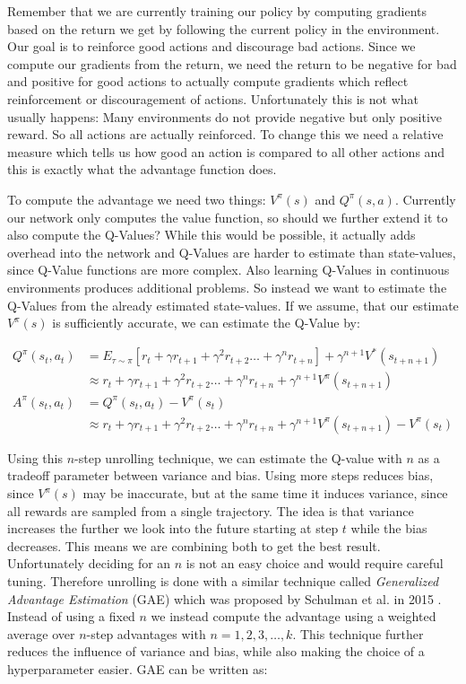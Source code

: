 Remember that we are currently training our policy by computing gradients based on the return we get by following the current policy in the environment. Our goal is to reinforce good actions and discourage bad actions. Since we compute our gradients from the return, we need the return to be negative for bad and positive for good actions to actually compute gradients which reflect reinforcement or discouragement of actions. Unfortunately this is not what usually happens: Many environments do not provide negative but only positive reward. So all actions are actually reinforced. To change this we need a relative measure which tells us how good an action is compared to all other actions and this is exactly what the advantage function does. 

To compute the advantage we need two things: $V^\pi(s)$ and $Q^\pi(s, a)$. Currently our network only computes the value function, so should we further extend it to also compute the Q-Values? While this would be possible, it actually adds overhead into the network and Q-Values are harder to estimate than state-values, since Q-Value functions are more complex. Also learning Q-Values in continuous environments produces additional problems. So instead we want to estimate the Q-Values from the already estimated state-values. If we assume, that our estimate $V^\pi(s)$ is sufficiently accurate, we can estimate the Q-Value by:

\begin{align*}
Q^\pi(s_t, a_t) &= E_{\tau\sim\pi}\left[r_t + \gamma r_{t+1} + \gamma^2 r_{t+2} \dots + \gamma^n r_{t+n}\right] + \gamma^{n+1}V^*(s_{t+n+1}) \\
&\approx r_t + \gamma r_{t+1} + \gamma^2 r_{t+2} \dots + \gamma^n r_{t+n} + \gamma^{n+1}V^\pi(s_{t+n+1}) \\[15pt]
A^\pi(s_t, a_t) &= Q^\pi(s_t, a_t) - V^\pi(s_t) \\
&\approx r_t + \gamma r_{t+1} + \gamma^2 r_{t+2} \dots + \gamma^n r_{t+n} + \gamma^{n+1}V^\pi(s_{t+n+1}) - V^\pi(s_t)
\end{align*}

Using this $n$-step unrolling technique, we can estimate the Q-value with $n$ as a tradeoff parameter between variance and bias. Using more steps reduces bias, since $V^\pi(s)$ may be inaccurate, but at the same time it induces variance, since all rewards are sampled from a single trajectory. The idea is that variance increases the further we look into the future starting at step $t$ while the bias decreases. This means we are combining both to get the best result. Unfortunately deciding for an $n$ is not an easy choice and would require careful tuning. Therefore unrolling is done with a similar technique called \textit{Generalized Advantage Estimation} (GAE) which was proposed by Schulman et al. in 2015 \cite{schulman2015high}. Instead of using a fixed $n$ we instead compute the advantage using a weighted average over $n$-step advantages with $n = 1, 2, 3, \dots, k$. This technique further reduces the influence of variance and bias, while also making the choice of a hyperparameter easier. GAE can be written as:

